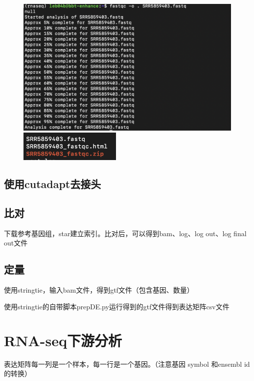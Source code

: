 \begin{figure}[ht]
    \begin{minipage}[C]{0.9\textwidth}
        \centering
        \includegraphics[width=13cm]{image/rnaseq/qc.PNG}
    \end{minipage}

    \begin{minipage}[C]{0.9\textwidth}
        \centering
        \includegraphics[width=5cm]{image/rnaseq/qcfile.PNG}
    \end{minipage}
\end{figure}

\subsection{使用cutadapt去接头}

\subsection{比对}
下载参考基因组，star建立索引。比对后，可以得到bam、log、log out、log final out文件

\subsection{定量}
使用stringtie，输入bam文件，得到gtf文件（包含基因、数量）

使用stringtie的自带脚本prepDE.py运行得到的gtf文件得到表达矩阵csv文件

\section{RNA-seq下游分析}
表达矩阵每一列是一个样本，每一行是一个基因。（注意基因 symbol 和ensembl id 的转换）

